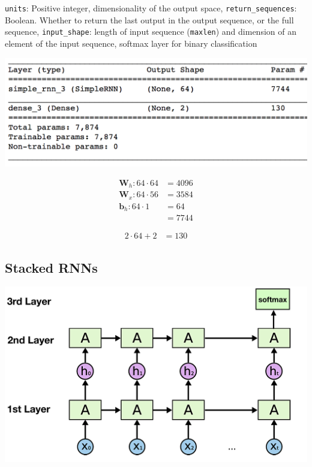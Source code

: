 \documentclass[11pt]{article}
\begin{document}
\texttt{units}: Positive integer, dimensionality of the output space, \texttt{return_sequences}: Boolean. Whether to return the last output in the output sequence, or the full sequence, \texttt{input_shape}: length of input sequence (\texttt{maxlen}) and dimension of an element of the input sequence, softmax layer for binary classification

\begin{center}
	\includegraphics[width=0.8\linewidth]{img/simple_rnn_summary}
\end{center}

\begin{minipage}{0.5\linewidth}
	\begin{align*}
	\textbf{W}_h: 64\cdot 64 &= 4096\\
	\textbf{W}_x: 64\cdot 56 &= 3584\\
	\textbf{b}_h: 64\cdot 1 &= 64\\
	&= 7744
	\end{align*}
\end{minipage}
\begin{minipage}{0.5\linewidth}
	\begin{align*}
	2\cdot 64 + 2 &= 130
	\end{align*}
\end{minipage}

\subsection{Stacked RNNs}
\begin{center}
	\includegraphics[width=0.6\linewidth]{img/stacked_rnns}
\end{center}
\end{document}
